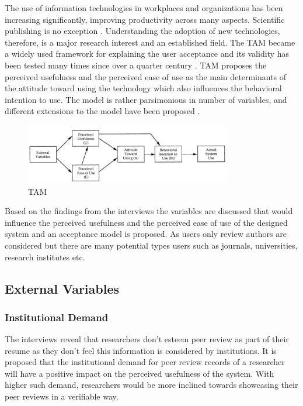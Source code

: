 The use of information technologies in workplaces and organizations has been increasing significantly, improving productivity across many aspects. Scientific publishing is no exception \parencite[132]{Ware.2015}. Understanding the adoption of new technologies, therefore, is a major research interest and an established field. The \acrlong{TAM} \parencite{Davis.1985, Davis.1989, Davis.1989b} became a widely used framework for explaining the user acceptance and its validity has been tested many times since over a quarter century \parencite{Marangunic.2015}. \acrshort{TAM} proposes the perceived usefulness and the perceived ease of use as the main determinants of the attitude toward using the technology which also influences the behavioral intention to use. The model is rather parsimonious in number of variables, and different extensions to the model have been proposed \parencite{Marangunic.2015}. 

\begin{figure}[htpb]
  \centering
  \includegraphics[width=0.8\textwidth]{figures/TAM.png}
  \caption{\acrlong{TAM} \parencite{Davis.1989b} } \label{fig:tam}
\end{figure}

Based on the findings from the interviews the variables are discussed that would influence the perceived usefulness and the perceived ease of use of the designed system and an acceptance model is proposed. As users only review authors are considered but there are many potential types users such as journals, universities, research institutes etc. 

\subsection{External Variables}

\subsubsection{Institutional Demand}

The interviews reveal that researchers don't esteem peer review as part of their resume as they don't feel this information is considered by institutions. It is proposed that the institutional demand for peer review records of a researcher will have a positive impact on the perceived usefulness of the system. With higher such demand, researchers would be more inclined towards showcasing their peer reviews in a verifiable way. 

